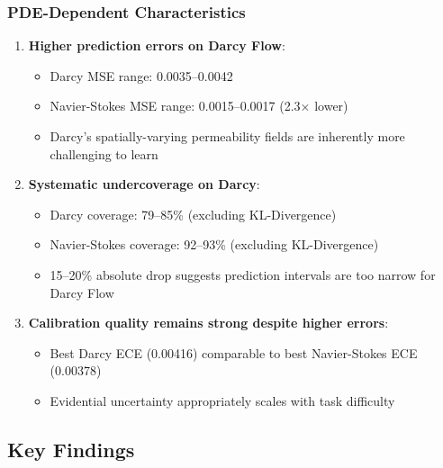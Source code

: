 \subsubsection{PDE-Dependent Characteristics}

\begin{enumerate}
\item \textbf{Higher prediction errors on Darcy Flow}:
\begin{itemize}
\item Darcy MSE range: 0.0035--0.0042
\item Navier-Stokes MSE range: 0.0015--0.0017 (2.3× lower)
\item Darcy's spatially-varying permeability fields are inherently more challenging to learn
\end{itemize}

\item \textbf{Systematic undercoverage on Darcy}:
\begin{itemize}
\item Darcy coverage: 79--85\% (excluding KL-Divergence)
\item Navier-Stokes coverage: 92--93\% (excluding KL-Divergence)
\item 15--20\% absolute drop suggests prediction intervals are too narrow for Darcy Flow
\end{itemize}

\item \textbf{Calibration quality remains strong despite higher errors}:
\begin{itemize}
\item Best Darcy ECE (0.00416) comparable to best Navier-Stokes ECE (0.00378)
\item Evidential uncertainty appropriately scales with task difficulty
\end{itemize}
\end{enumerate}

\subsection{Key Findings}

